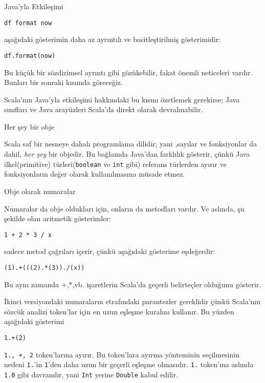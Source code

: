 \documentclass[10pt,a4paper]{book}
\begin{document}
\begin{chapter}{Java'yla Etkileşimi}
\begin{verbatim}
df format now
\end{verbatim}

aşağıdaki gösterimin daha az ayrıntılı ve basitleştirilmiş gösterimidir:

\begin{verbatim}
df.format(now)
\end{verbatim}

Bu küçük bir sözdizimsel ayrıntı gibi gözükebilir, fakat önemli neticeleri vardır. Bunları bir sonraki kısımda göreceğiz.

Scala'nın Java'yla etkileşimi hakkındaki bu kısmı özetlemek gerekirse; Java sınıfları ve Java arayüzleri Scala'da direkt olarak devralınabilir.
\end{chapter}

\begin{chapter}{Her şey bir obje}

Scala saf bir nesneye dahalı programlama dilidir; yani ,sayılar ve fonksiyonlar da dahil, \textit{her şey} bir objedir. Bu bağlamda Java'dan farklılık gösterir, çünkü Java ilkel(primitive) türleri(\texttt{boolean} ve \texttt{int} gibi) referans türlerden ayırır ve fonksiyonların değer olarak kullanılmasına müsade etmez.

\begin{section}{Obje olarak numaralar}

Numaralar da obje oldukları için, onların da metodları vardır. Ve aslında, şu şekilde olan aritmetik gösterimler;

\begin{verbatim}
1 + 2 * 3 / x
\end{verbatim}

sadece metod çağrıları içerir, çünkü aşağıdaki gösterime eşdeğerdir:

\begin{verbatim}
(1).+(((2).*(3))./(x))
\end{verbatim}

Bu aynı zamanda +,*,vb. işaretlerin Scala'da geçerli belirteçler olduğunu gösterir.

İkinci versiyondaki numaraların etrafındaki parantezler gereklidir çünkü Scala'nın sözcük analizi token'lar için en uzun eşleşme kuralını kullanır. Bu yüzden aşağıdaki gösterimi

\begin{verbatim}
1.+(2)
\end{verbatim}

\texttt{1., +, 2} token'larına ayırır. Bu token'lara ayırma yönteminin seçilmesinin nedeni \texttt{1.}'in \texttt{1}'den daha uzun bir geçerli eşleşme olmasıdır. \texttt{1.} token'ına aslında \texttt{1.0} gibi davranılır, yani \texttt{Int} yerine \texttt{Double} kabul edilir.


\end{section}
\end{chapter}
\end{document}
